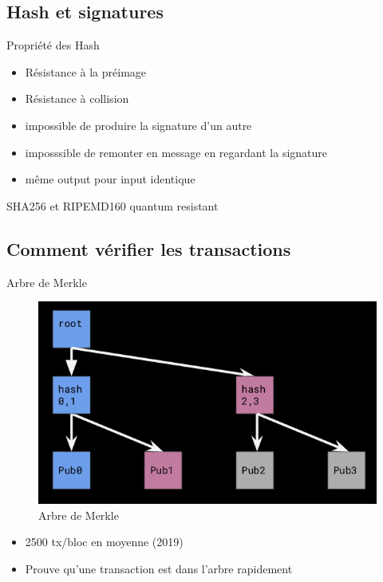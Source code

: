 \documentclass[presentation]{beamer}
\begin{document}
\subsection{Hash et signatures}
\label{sec:org762f216}
\begin{frame}[label={sec:org3e924b3}]{Propriété des Hash}
\begin{itemize}
\item Résistance à la préimage
\item Résistance à collision
\item impossible de produire la signature d'un autre
\item imposssible de remonter en message en regardant la signature
\item même output pour input identique
\end{itemize}
\begin{block}{SHA256 et RIPEMD160}
quantum resistant
\end{block}
\end{frame}

\subsection{Comment vérifier les transactions}
\label{sec:org517c5b0}
\begin{frame}[label={sec:orgb818462}]{Arbre de Merkle}
\begin{figure}[htbp]
\centering
\includegraphics[height=.8\textheight]{Images/merkle.png}
\caption{Arbre de Merkle}
\end{figure}

\begin{itemize}
\item 2500 tx/bloc en moyenne (2019)
\item Prouve qu'une transaction est dans l'arbre rapidement
\end{itemize}
\end{frame}
\end{document}
